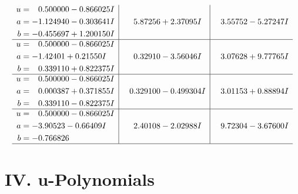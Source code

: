 \documentclass[1p]{elsarticle_modified}
\theoremstyle{definition}
\begin{document}
$$\begin{array}{c|c|c}
\begin{aligned}
u &= \phantom{-}0.500000 - 0.866025 I \\
a &= -1.124940 - 0.303641 I \\
b &= -0.455697 + 1.200150 I\end{aligned}
 & \phantom{-}5.87256 + 2.37095 I & \phantom{-}3.55752 - 5.27247 I \\ \hline\begin{aligned}
u &= \phantom{-}0.500000 - 0.866025 I \\
a &= -1.42401 + 0.21550 I \\
b &= \phantom{-}0.339110 + 0.822375 I\end{aligned}
 & \phantom{-}0.32910 - 3.56046 I & \phantom{-}3.07628 + 9.77765 I \\ \hline\begin{aligned}
u &= \phantom{-}0.500000 - 0.866025 I \\
a &= \phantom{-}0.000387 + 0.371855 I \\
b &= \phantom{-}0.339110 - 0.822375 I\end{aligned}
 & \phantom{-}0.329100 - 0.499304 I & \phantom{-}3.01153 + 0.88894 I \\ \hline\begin{aligned}
u &= \phantom{-}0.500000 - 0.866025 I \\
a &= -3.90523 - 0.66409 I \\
b &= -0.766826\phantom{ +0.000000I}\end{aligned}
 & \phantom{-}2.40108 - 2.02988 I & \phantom{-}9.72304 - 3.67600 I\\
 \hline 
 \end{array}$$\newpage
\newpage\renewcommand{\arraystretch}{1}
\centering \section*{ IV. u-Polynomials}
\end{document}
